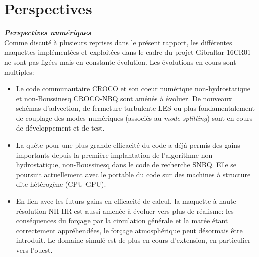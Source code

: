 \documentclass[a4paper,11pt]{report}
\begin{document}
\section{Perspectives}

 \noindent\textit{\textbf{Perspectives numériques}}\\
 Comme discuté à plusieurs reprises dans le présent rapport, les différentes maquettes implémentées et exploitées dans le cadre du projet Gibraltar 16CR01 ne sont pas figées mais en constante évolution. Les évolutions en cours sont multiples:
 \begin{itemize}
     \item Le code communautaire CROCO et son coeur numérique non-hydrostatique et non-Boussinesq CROCO-NBQ sont aménés à évoluer. De nouveaux schémas d'advection, de fermeture turbulente LES ou plus fondamentalement de couplage des modes numériques (associés au \textit{mode splitting}) sont en cours de développement et de test.
     \item La quête pour une plus grande efficacité du code a déjà permis des gains importants depuis la première implantation de l'algorithme non-hydrostatique, non-Boussinesq dans le code de recherche SNBQ. Elle se poursuit actuellement avec le portable du code sur des machines à structure dite hétérogène (CPU-GPU).
     \item En lien avec les futurs gains en efficacité de calcul, la maquette à haute résolution NH-HR est aussi amenée à évoluer vers plus de réalisme: les conséquences du forçage par la circulation générale et la marée étant correctement appréhendées, le forçage atmosphérique peut désormais être introduit. Le domaine simulé est de plus en cours d'extension, en particulier vers l'ouest.
 \end{itemize}
 
\end{document}
